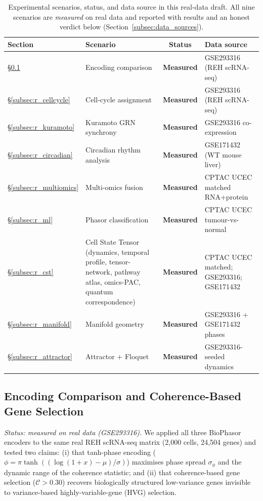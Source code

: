 \documentclass[preprint,12pt,amsmath,amssymb,superscriptaddress,floatfix]{revtex4-2}
\begin{document}
\begin{table}[h]
\centering
\caption{Experimental scenarios, status, and data source in this real-data
draft. All nine scenarios are \emph{measured} on real data and reported with
results and an honest verdict below (Section~\ref{subsec:data_sources}).}
\label{tab:experiments}
\begin{tabular}{p{1.7cm}p{4.0cm}cp{5.0cm}}
\toprule
\textbf{Section} & \textbf{Scenario} & \textbf{Status} & \textbf{Data source} \\
\midrule
\S\ref{subsec:r_encoding}  & Encoding comparison & \textbf{Measured} & GSE293316 (REH scRNA-seq) \\
\S\ref{subsec:r_cellcycle} & Cell-cycle assignment & \textbf{Measured} & GSE293316 (REH scRNA-seq) \\
\S\ref{subsec:r_kuramoto}  & Kuramoto GRN synchrony & \textbf{Measured} & GSE293316 co-expression \\
\S\ref{subsec:r_circadian} & Circadian rhythm analysis & \textbf{Measured} & GSE171432 (WT mouse liver) \\
\S\ref{subsec:r_multiomics}& Multi-omics fusion & \textbf{Measured} & CPTAC UCEC matched RNA+protein \\
\S\ref{subsec:r_ml}        & Phasor classification & \textbf{Measured} & CPTAC UCEC tumour-vs-normal \\
\S\ref{subsec:r_cst}       & Cell State Tensor (dynamics, temporal profile, tensor-network, pathway atlas, omics-PAC, quantum correspondence) & \textbf{Measured} & CPTAC UCEC matched; GSE293316; GSE171432 \\
\S\ref{subsec:r_manifold}  & Manifold geometry & \textbf{Measured} & GSE293316 + GSE171432 phases \\
\S\ref{subsec:r_attractor} & Attractor + Floquet & \textbf{Measured} & GSE293316-seeded dynamics \\
\bottomrule
\end{tabular}
\end{table}

\subsection{Encoding Comparison and Coherence-Based Gene Selection}
\label{subsec:r_encoding}

\emph{Status: measured on real data (GSE293316).} We applied all three
BioPhasor encoders to the same real REH scRNA-seq matrix (2{,}000 cells,
24{,}504 genes) and tested two claims: (i) that tanh-phase encoding
($\phi = \pi\tanh((\log(1{+}x)-\mu)/\sigma)$) maximises phase spread
$\sigma_\phi$ and the dynamic range of the coherence statistic; and (ii) that
coherence-based gene selection ($\mathcal{C} > 0.30$) recovers biologically
structured low-variance genes invisible to variance-based highly-variable-gene
(HVG) selection.
\end{document}
